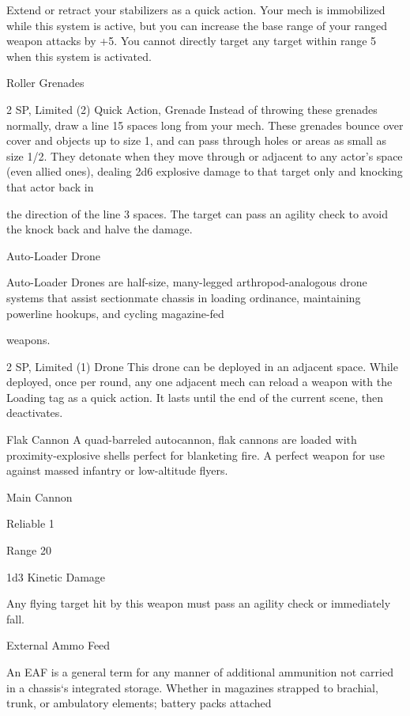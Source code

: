 Extend or retract your stabilizers as a quick action. Your mech is immobilized while this system is  
active, but you can increase the base range of your ranged weapon attacks by +5. You cannot  
directly target any target within range 5 when this system is activated.
 

Roller Grenades  

2 SP, Limited (2)  
Quick Action, Grenade  
Instead of throwing these grenades normally, draw a line 15 spaces long from your mech. These  
grenades bounce over cover and objects up to size 1, and can pass through holes or areas as  
small as size 1/2. They detonate when they move through or adjacent to any actor’s space (even  
allied ones), dealing 2d6 explosive damage to that target only and knocking that actor back in  

                                                                                                                


the direction of the line 3 spaces. The target can pass an agility check to avoid the knock back  
and halve the damage.
 

Auto-Loader Drone  

Auto-Loader Drones are half-size, many-legged arthropod-analogous drone systems that assist  
sectionmate chassis in loading ordinance, maintaining powerline hookups, and cycling magazine-fed  

weapons.  

2 SP, Limited (1)  
Drone  
This drone can be deployed in an adjacent space. While deployed, once per round, any one  
adjacent mech can reload a weapon with the Loading tag as a quick action. It lasts until the end  
of the current scene, then deactivates.
 

Flak Cannon  
A quad-barreled autocannon, flak cannons are loaded with proximity-explosive shells perfect for  
blanketing fire. A perfect weapon for use against massed infantry or low-altitude flyers.   

Main Cannon
 
Reliable 1
 
Range 20
 
1d3 Kinetic Damage
 
Any flying target hit by this weapon must pass an agility check or immediately fall.  

External Ammo Feed 
 

An EAF is a general term for any manner of additional ammunition not carried in a chassis‘s integrated  
storage. Whether in magazines strapped to brachial, trunk, or ambulatory elements; battery packs attached  

